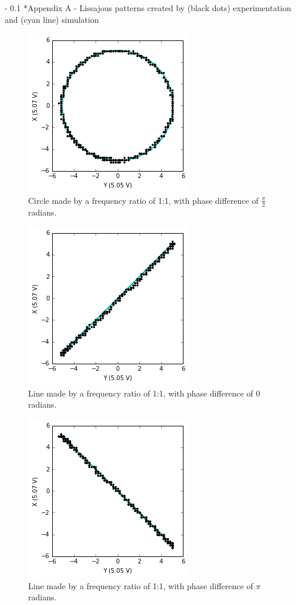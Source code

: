 \documentclass[twoside]{article}
\makeatletter
\renewcommand\section{\@startsection
   {section}{1}{0pt}%
   {-\baselineskip}%
   {0.1\baselineskip}%
   {\normalfont\large\bfseries}}%
\makeatother
\begin{document}
\newpage

\section*{Appendix A - Lissajous patterns created by (black dots) experimentation and (cyan line) simulation}
\label{sec:appendixA}
\begin{figure}[h!]
\centering
\includegraphics[scale=0.5]{1to1}
\caption{ Circle made by a frequency ratio of 1:1, with phase difference of $\frac{\pi}{2}$ radians.}
\label{fig:oscilloscope}
\end{figure}

\begin{figure}[h!]
\centering
\includegraphics[scale=0.5]{1to1zero}
\caption{ Line made by a frequency ratio of 1:1, with phase difference of $0$ radians.}
\label{fig:oscilloscope}
\end{figure}

\begin{figure}[h!]
\centering
\includegraphics[scale=0.5]{1to1180}
\caption{ Line made by a frequency ratio of 1:1, with phase difference of $\pi$ radians.}
\label{fig:oscilloscope}
\end{figure}
\end{document}
